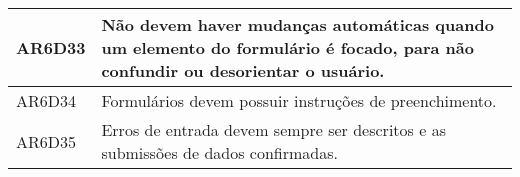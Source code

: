 \begin{table}[htb]
\begin{center}
\begin{tabular}{p{1.2cm}|p{13.5cm}}
      \hline
      AR6D33          & Não devem haver mudanças automáticas quando um elemento do formulário é focado, para não confundir ou desorientar o usuário.                 \\
      \hline
      AR6D34          & Formulários devem possuir instruções de preenchimento.                                                                                       \\
      \hline
      AR6D35          & Erros de entrada devem sempre ser descritos e as submissões de dados confirmadas.                                                            \\
    \end{tabular}
  \end{center}
\end{table}
